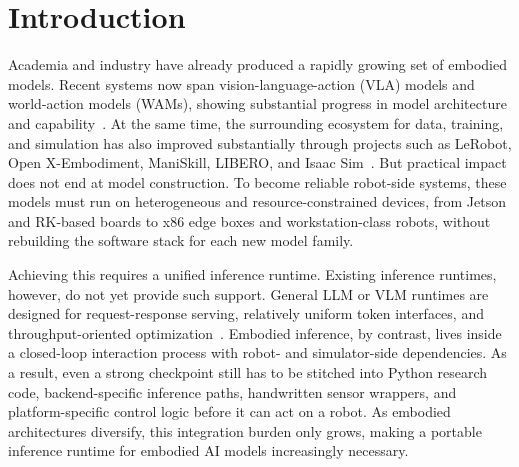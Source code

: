 \documentclass[11pt,letterpaper,logo]{seu-paisys}
\begin{document}
\section{Introduction}

Academia and industry have already produced a rapidly growing set of embodied models. Recent systems now span vision-language-action (VLA) models and world-action models (WAMs), showing substantial progress in model architecture and capability~\cite{openvla,pi0,pi05,grootn1,lingbotva,wam-survey,li2026stop}. At the same time, the surrounding ecosystem for data, training, and simulation has also improved substantially through projects such as LeRobot, Open X-Embodiment, ManiSkill, LIBERO, and Isaac Sim~\cite{lerobot,openx,maniskill,libero,isaacsim}. But practical impact does not end at model construction. To become reliable robot-side systems, these models must run on heterogeneous and resource-constrained devices, from Jetson and RK-based boards to x86 edge boxes and workstation-class robots, without rebuilding the software stack for each new model family.


Achieving this requires a unified inference runtime. Existing inference runtimes, however, do not yet provide such support. General LLM or VLM runtimes are designed for request-response serving, relatively uniform token interfaces, and throughput-oriented optimization~\cite{llama-cpp,onnxruntime,sglang,vllm-omni}. Embodied inference, by contrast, lives inside a closed-loop interaction process with robot- and simulator-side dependencies. As a result, even a strong checkpoint still has to be stitched into Python research code, backend-specific inference paths, handwritten sensor wrappers, and platform-specific control logic before it can act on a robot. As embodied architectures diversify, this integration burden only grows, making a portable inference runtime for embodied AI models increasingly necessary.
\end{document}
